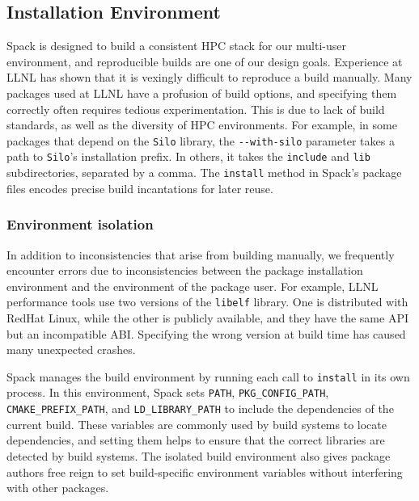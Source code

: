 
\subsection{Installation Environment}

Spack is designed to build a consistent HPC stack for our multi-user
environment, and reproducible builds are one of our design goals.
Experience at LLNL has shown that it is vexingly difficult to reproduce
a build manually.
%
Many packages used at LLNL have a profusion of build options, and specifying
them correctly often requires tedious experimentation.  This is due to lack of
build standards, as well as the diversity of HPC environments.
For example, in some packages that depend on the {\tt Silo} library,
the \verb|--with-silo| parameter takes a path to {\tt Silo}'s installation prefix.
In others, it takes the {\tt include} and {\tt lib} subdirectories,
separated by a comma.
The {\tt install} method in Spack's package files encodes precise build
incantations for later reuse.

\subsubsection{Environment isolation}
In addition to inconsistencies that arise from building manually, we
frequently encounter errors due to inconsistencies between the package
installation environment and the environment of the package user.
%
For example, LLNL performance tools use two versions of the {\tt libelf}
library. One is distributed with RedHat Linux, while the
other is publicly available, and they have the same API but an incompatible ABI.
Specifying the wrong version at build time has caused many
unexpected crashes.

Spack manages the build environment by running each call to {\tt install}
in its own process.  In this environment, Spack sets
{\tt PATH}, {\tt PKG\_CONFIG\_PATH}, {\tt CMAKE\_PREFIX\_PATH}, and
{\tt LD\_LIBRARY\_PATH} to include the dependencies of the current build.
These variables are commonly used by build systems to locate dependencies,
and setting them helps to ensure that the correct libraries are detected by
build systems.
The isolated build environment also gives package authors
free reign to set build-specific environment variables without interfering
with other packages.


